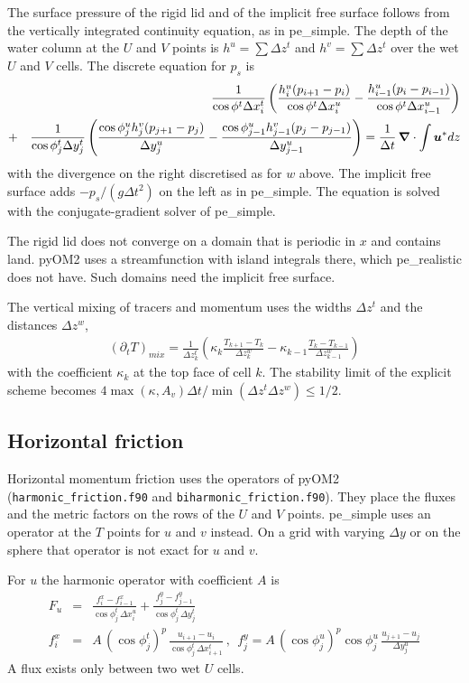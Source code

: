 \documentclass[12pt]{article}
\newcommand{\beeq}  { \begin{eqnarray*} }
\newcommand{\eeeq}  { \end{eqnarray*}}
\renewcommand{\v}[1]{{\mbox{\boldmath$ #1 $}}}  %
\newcommand{\pt}[1]{{\partial_t #1}}
\newcommand{\vn}{{\v \nabla}}
\newcommand{\lk}{\left(}
\newcommand{\rk}{\right)}
\begin{document}
The surface pressure of the rigid lid and of the implicit free surface follows from the vertically integrated continuity equation, as in pe\_simple.
The depth of the water column at the $U$ and $V$ points is $h^u = \sum \Delta z^t$ and $h^v = \sum \Delta z^t$ over the wet $U$ and $V$ cells.
The discrete equation for $p_s$ is
\beeq
 && \frac{1}{\cos \phi^t \Delta x^t_i} \lk
   \frac{h^u_i (p_{i+1} - p_i)}{\cos \phi^t \Delta x^u_i}
 - \frac{h^u_{i-1} (p_i - p_{i-1})}{\cos \phi^t \Delta x^u_{i-1}} \rk \\
 &+& \frac{1}{\cos \phi^t_j \Delta y^t_j} \lk
   \frac{\cos \phi^u_j h^v_j (p_{j+1} - p_j)}{\Delta y^u_j}
 - \frac{\cos \phi^u_{j-1} h^v_{j-1} (p_j - p_{j-1})}{\Delta y^u_{j-1}} \rk
 = \frac{1}{\Delta t}\, \vn \cdot \int \v u^* dz
\eeeq
with the divergence on the right discretised as for $w$ above.
The implicit free surface adds $-p_s/(g \Delta t^2)$ on the left as in pe\_simple.
The equation is solved with the conjugate-gradient solver of pe\_simple.

The rigid lid does not converge on a domain that is periodic in $x$ and contains land.
pyOM2 uses a streamfunction with island integrals there, which pe\_realistic does not have.
Such domains need the implicit free surface.

The vertical mixing of tracers and momentum uses the widths $\Delta z^t$ and the distances $\Delta z^w$,
\beeq
 (\pt T)_{mix} = \frac{1}{\Delta z^t_k} \lk
   \kappa_k \frac{T_{k+1} - T_k}{\Delta z^w_k}
 - \kappa_{k-1} \frac{T_k - T_{k-1}}{\Delta z^w_{k-1}} \rk
\eeeq
with the coefficient $\kappa_k$ at the top face of cell $k$.
The stability limit of the explicit scheme becomes $4 \max(\kappa, A_v) \Delta t / \min(\Delta z^t \Delta z^w) \le 1/2$.

\subsection*{Horizontal friction}

Horizontal momentum friction uses the operators of pyOM2 (\verb|harmonic_friction.f90| and \verb|biharmonic_friction.f90|).
They place the fluxes and the metric factors on the rows of the $U$ and $V$ points.
pe\_simple uses an operator at the $T$ points for $u$ and $v$ instead.
On a grid with varying $\Delta y$ or on the sphere that operator is not exact for $u$ and $v$.

For $u$ the harmonic operator with coefficient $A$ is
\beeq
 F_u &=& \frac{f^x_i - f^x_{i-1}}{\cos \phi^t_j\, \Delta x^u_i}
       + \frac{f^y_j - f^y_{j-1}}{\cos \phi^t_j\, \Delta y^t_j} \\
 f^x_i &=& A \, (\cos \phi^t_j)^p \, \frac{u_{i+1} - u_i}{\cos \phi^t_j\, \Delta x^t_{i+1}} ~,~~
 f^y_j = A \, (\cos \phi^u_j)^p \cos \phi^u_j \, \frac{u_{j+1} - u_j}{\Delta y^u_j}
\eeeq
A flux exists only between two wet $U$ cells.
\end{document}
